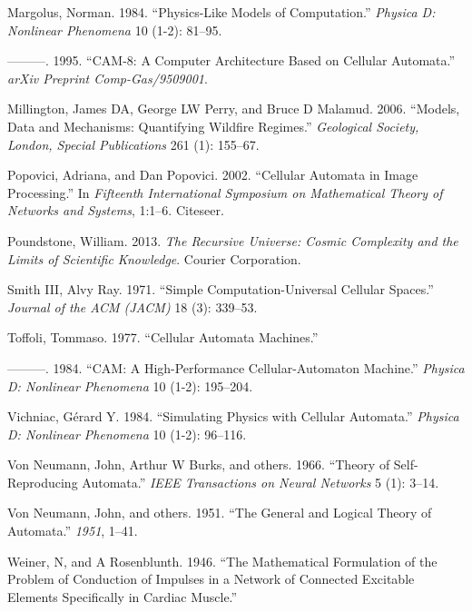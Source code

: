 \documentclass[
]{book}
\newlength{\cslhangindent}
\newenvironment{cslreferences}%
  {\setlength{\parindent}{0pt}%
  \everypar{\setlength{\hangindent}{\cslhangindent}}\ignorespaces}%
  {\par}
\begin{document}
\begin{cslreferences}
\leavevmode\hypertarget{ref-margolus1984physics}{}%
Margolus, Norman. 1984. ``Physics-Like Models of Computation.'' \emph{Physica D: Nonlinear Phenomena} 10 (1-2): 81--95.

\leavevmode\hypertarget{ref-margolus1995cam}{}%
---------. 1995. ``CAM-8: A Computer Architecture Based on Cellular Automata.'' \emph{arXiv Preprint Comp-Gas/9509001}.

\leavevmode\hypertarget{ref-millington2006models}{}%
Millington, James DA, George LW Perry, and Bruce D Malamud. 2006. ``Models, Data and Mechanisms: Quantifying Wildfire Regimes.'' \emph{Geological Society, London, Special Publications} 261 (1): 155--67.

\leavevmode\hypertarget{ref-popovici2002cellular}{}%
Popovici, Adriana, and Dan Popovici. 2002. ``Cellular Automata in Image Processing.'' In \emph{Fifteenth International Symposium on Mathematical Theory of Networks and Systems}, 1:1--6. Citeseer.

\leavevmode\hypertarget{ref-poundstone2013recursive}{}%
Poundstone, William. 2013. \emph{The Recursive Universe: Cosmic Complexity and the Limits of Scientific Knowledge}. Courier Corporation.

\leavevmode\hypertarget{ref-smith1971simple}{}%
Smith III, Alvy Ray. 1971. ``Simple Computation-Universal Cellular Spaces.'' \emph{Journal of the ACM (JACM)} 18 (3): 339--53.

\leavevmode\hypertarget{ref-toffoli1977cellular}{}%
Toffoli, Tommaso. 1977. ``Cellular Automata Machines.''

\leavevmode\hypertarget{ref-toffoli1984cam}{}%
---------. 1984. ``CAM: A High-Performance Cellular-Automaton Machine.'' \emph{Physica D: Nonlinear Phenomena} 10 (1-2): 195--204.

\leavevmode\hypertarget{ref-vichniac1984simulating}{}%
Vichniac, Gérard Y. 1984. ``Simulating Physics with Cellular Automata.'' \emph{Physica D: Nonlinear Phenomena} 10 (1-2): 96--116.

\leavevmode\hypertarget{ref-von1966theory}{}%
Von Neumann, John, Arthur W Burks, and others. 1966. ``Theory of Self-Reproducing Automata.'' \emph{IEEE Transactions on Neural Networks} 5 (1): 3--14.

\leavevmode\hypertarget{ref-von1951general}{}%
Von Neumann, John, and others. 1951. ``The General and Logical Theory of Automata.'' \emph{1951}, 1--41.

\leavevmode\hypertarget{ref-weiner1946mathematical}{}%
Weiner, N, and A Rosenblunth. 1946. ``The Mathematical Formulation of the Problem of Conduction of Impulses in a Network of Connected Excitable Elements Specifically in Cardiac Muscle.''


\end{cslreferences}
\end{document}
